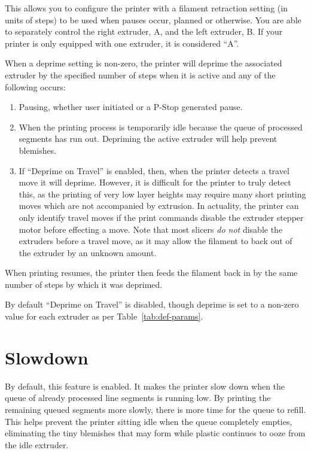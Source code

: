 This allows you to configure the printer with a filament retraction setting (in units of steps) to be used when pauses occur, planned or otherwise.  You are able to separately control the right extruder, A, and the left extruder, B.  If your printer is only equipped with one extruder, it is considered ``A''.

When a deprime setting is non-zero, the printer will deprime the associated extruder by the specified number of steps when it is active and any of the following occurs:

\begin{enumerate}
\item Pausing, whether user initiated or a P-Stop generated pause.
\item When the printing process is temporarily idle because the queue of processed segments has run out.  Depriming the active extruder will help prevent blemishes.
\item If ``Deprime on Travel'' is enabled, then, when the printer detects a \gls{travel move} it will deprime.  However, it is difficult for the printer to truly detect this, as the printing of very low layer heights may require many short printing moves which are not accompanied by extrusion.  In actuality, the printer can only identify travel moves if the print commands disable the extruder stepper motor before effecting a move.  Note that most slicers \emph{do not} disable the extruders before a travel move, as it may allow the filament to back out of the extruder by an unknown amount.
\end{enumerate}

When printing resumes, the printer then feeds the filament back in by the same number of steps by which it was deprimed.

By default ``Deprime on Travel'' is disabled, though deprime is set to a non-zero value for each extruder as per Table~\ref{tab:def-params}.


\section{Slowdown} \label{sec:slowdown}

By default, this feature is enabled.  It makes the printer slow down when the queue of already processed line segments is running low.  By printing the remaining queued segments more slowly, there is more time for the queue to refill.  This helps prevent the printer sitting idle when the queue completely empties, eliminating the tiny blemishes that may form while plastic continues to ooze from the idle extruder.

